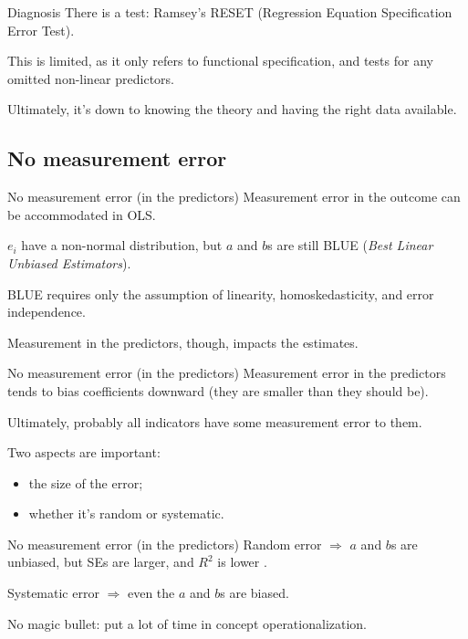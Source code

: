 \documentclass[12pt,english,pdf,xcolor=dvipsnames,aspectratio=169,handout]{beamer}\usepackage[]{graphicx}\usepackage[]{xcolor}
\begin{document}
\begin{frame}{Diagnosis}
There is a test: Ramsey's RESET (Regression Equation Specification Error Test).\bigskip

This is limited, as it only refers to functional specification, and tests for any omitted non-linear predictors.\bigskip

Ultimately, it's down to knowing the theory and having the right data available.

\end{frame}



\subsection{No measurement error}

\begin{frame}{No measurement error (in the predictors)}
Measurement error in the outcome can be accommodated in OLS.\bigskip

$e_i$ have a non-normal distribution, but $a$ and $b$s are still BLUE (\textit{Best Linear Unbiased Estimators}).\bigskip

BLUE requires only the assumption of linearity, homoskedasticity, and error independence.\bigskip

Measurement in the predictors, though, impacts the estimates.

\end{frame}


\begin{frame}{No measurement error (in the predictors)}
Measurement error in the predictors tends to bias coefficients downward (they are smaller than they should be).\bigskip

Ultimately, probably all indicators have some measurement error to them.\bigskip

Two aspects are important:

\begin{itemize}
\item the size of the error;
\item whether it's random or systematic.
\end{itemize}

\end{frame}



\begin{frame}{No measurement error (in the predictors)}
Random error $\Rightarrow$ $a$ and $b$s are unbiased, but SEs are larger, and $R^2$ is lower \cite[p.~51]{berry1993}.\bigskip

Systematic error $\Rightarrow$ even the $a$ and $b$s are biased.\bigskip

No magic bullet: put a lot of time in concept operationalization.\bigskip

\end{frame}
\end{document}

